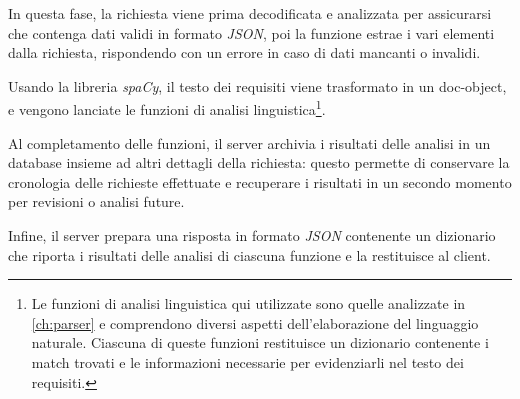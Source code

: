 \documentclass[12pt]{report}
\newcommand{\spacy}{\textsl{spaCy}\xspace}
\newcommand{\json}{\textsl{JSON}\xspace}
\begin{document}
In questa fase, la richiesta viene prima decodificata e analizzata per assicurarsi che contenga dati validi in formato \json, poi la funzione estrae i vari elementi dalla richiesta, rispondendo con un errore in caso di dati mancanti o invalidi.

Usando la libreria \spacy, il testo dei requisiti viene trasformato in un doc-object, e vengono lanciate le funzioni di analisi linguistica\footnote{Le funzioni di analisi linguistica qui utilizzate sono quelle analizzate in \cref{ch:parser} e comprendono diversi aspetti dell'elaborazione del linguaggio naturale. Ciascuna di queste funzioni restituisce un dizionario contenente i match trovati e le informazioni necessarie per evidenziarli nel testo dei requisiti.}.

Al completamento delle funzioni, il server archivia i risultati delle analisi in un database insieme ad altri dettagli della richiesta: questo permette di conservare la cronologia delle richieste effettuate e recuperare i risultati in un secondo momento per revisioni o analisi future.

Infine, il server prepara una risposta in formato \json contenente un dizionario che riporta i risultati delle analisi di ciascuna funzione e la restituisce al client.
\end{document}
